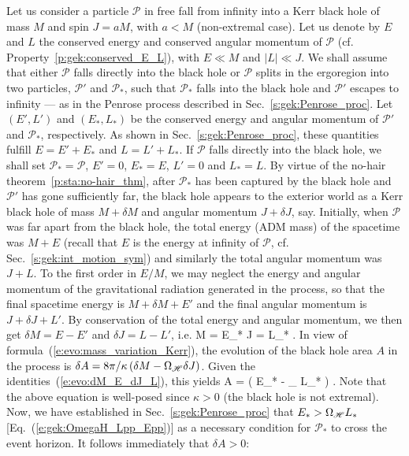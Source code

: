 Let us consider a particle $\mathscr{P}$ in free fall from infinity into a
Kerr black hole of mass $M$ and spin $J= a M$, with
$a < M$ (non-extremal case). Let us denote by $E$ and $L$ the
conserved energy and conserved angular momentum of $\mathscr{P}$ (cf. Property~\ref{p:gek:conserved_E_L}), with $E\ll M$ and $|L| \ll J$.
We shall assume that either $\mathscr{P}$ falls directly into the black hole or
$\mathscr{P}$ splits in the ergoregion into
two particles, $\mathscr{P}'$ and $\mathscr{P}_*$,
such that $\mathscr{P}_*$ falls into the black hole and $\mathscr{P}'$
escapes to infinity --- as in the Penrose process described
in Sec.~\ref{s:gek:Penrose_proc}.
Let $(E',L')$ and $(E_*,L_*)$ be the conserved
energy and angular momentum of $\mathscr{P}'$ and $\mathscr{P}_*$, respectively.
As shown in Sec.~\ref{s:gek:Penrose_proc}, these quantities fulfill
$E = E' + E_*$ and $L = L' + L_*$. If $\mathscr{P}$ falls directly into the black hole,
we shall set $\mathscr{P}_* = \mathscr{P}$,
$E'=0$, $E_*=E$, $L'=0$ and $L_*=L$.
By virtue of the no-hair theorem~\ref{p:sta:no-hair_thm},
after $\mathscr{P}_*$ has been captured by the black hole and
$\mathscr{P}'$ has gone sufficiently far,
the black hole
appears to the exterior world as a Kerr black hole of mass $M +\delta M$
and angular momentum $J + \delta J$, say.
Initially, when $\mathscr{P}$ was far apart from the black hole, the total energy (ADM mass)
of the spacetime was $M + E$ (recall that $E$ is the energy at infinity
of $\mathscr{P}$, cf. Sec.~\ref{s:gek:int_motion_sym}) and similarly the
total angular momentum was $J + L$.
To the first order in $E/M$, we may neglect the energy and angular momentum
of the gravitational radiation generated in the process, so that the final spacetime energy is
$M + \delta M + E'$ and the final angular momentum is $J + \delta J + L'$.
By conservation of the total energy and angular momentum, we then get
$\delta M = E - E'$ and $\delta J = L - L'$, i.e.
\be \label{e:evo:dM_E_dJ_L}
    \delta M = E_* \qand \delta J = L_* .
\ee
In view of formula~(\ref{e:evo:mass_variation_Kerr}), the evolution of the black hole
area $A$ in the process is $\delta A = 8\pi/\kappa \left( \delta M - \Omega_{\mathscr{H}} \delta J \right)$.
Given the identities~(\ref{e:evo:dM_E_dJ_L}), this yields
\be \label{e:evo:dA_Estar_Jstar}
    \delta A = \frac{8\pi}{\kappa} \left( E_* - \Omega_{\Hor}  L_* \right) .
\ee
Note that the above equation is well-posed since $\kappa > 0$ (the black hole is not extremal).
Now, we have established in Sec.~\ref{s:gek:Penrose_proc} that
$E_* > \Omega_{\mathscr{H}}  L_*$ [Eq.~(\ref{e:gek:OmegaH_Lpp_Epp})] as
a necessary condition for $\mathscr{P}_*$ to cross the event horizon.
It follows immediately that $\delta A > 0$:

